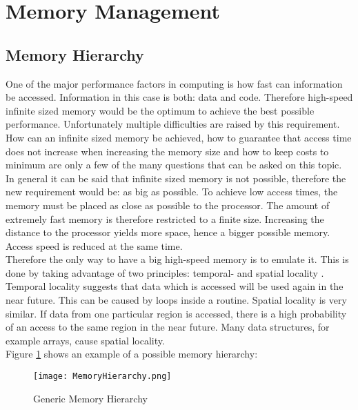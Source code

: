 \section{Memory Management}
\subsection{Memory Hierarchy}
One of the major performance factors in computing is how fast can information be accessed. Information in this case is both: data and code. Therefore high-speed infinite sized memory would be the optimum to achieve the best possible performance. Unfortunately multiple difficulties are raised by this requirement. How can an infinite sized memory be achieved, how to guarantee that access time does not increase when increasing the memory size and how to keep costs to minimum are only a few of the many questions that can be asked on this topic.\\
In general it can be said that infinite sized memory is not possible, therefore the new requirement would be: as big as possible. To achieve low access times, the memory must be placed as close as possible to the processor. The amount of extremely fast memory is therefore restricted to a finite size. Increasing the distance to the processor yields more space, hence a bigger possible memory. Access speed is reduced at the same time.\\
Therefore the only way to have a big high-speed memory is to emulate it. This is done by taking advantage of two principles: temporal- and spatial locality \cite{patterson:2017}.
Temporal locality suggests that data which is accessed will be used again in the near future. This can be caused by loops inside a routine. 
Spatial locality is very similar. If data from one particular region is accessed, there is a high probability of an access to the same region in the near future. Many data structures, for example arrays, cause spatial locality.\\
Figure \ref{fig:memHierarchy} shows an example of a possible memory hierarchy: 

\begin{figure}[h]
	\centering
	\texttt{[image: MemoryHierarchy.png]}
	\caption{Generic Memory Hierarchy \cite{picture:memoryhierarchy}}
	\label{fig:memHierarchy}
\end{figure}
 
